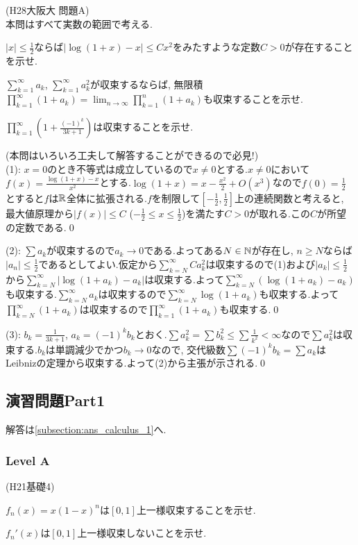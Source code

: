 \begin{egprob} (H28大阪大 問題A) \label{egprob:H28-osaka-A}\\
本問はすべて実数の範囲で考える.
\ben
\item $|x| \leq \frac{1}{2}$ならば$|\log{(1+x)} - x|\leq Cx^2$をみたすような定数$C>0$が存在することを示せ.
\item $\sum_{k=1}^{\infty}a_k$, $\sum_{k=1}^{\infty}a_k^2$が収束するならば, 無限積$\prod_{k=1}^{\infty} (1+a_k) = \lim_{n\to \infty} \prod_{k=1}^{n} (1+a_k)$も収束することを示せ.
\item $\prod_{k=1}^{\infty} \left(1+\frac{(-1)^{k}}{3k+1}\right)$は収束することを示せ.
\een
\end{egprob}
\begin{egans} (本問はいろいろ工夫して解答することができるので必見!)\\
(1): $x=0$のとき不等式は成立しているので$x\neq 0$とする.$x\neq 0$において$f(x) = \frac{\log{(1+x)} - x}{x^2}$とする.$\log{(1+x)} = x - \frac{x^2}{2} + O(x^3)$なので$f(0) = \frac{1}{2}$とすると$f$は$\mathbb{R}$全体に拡張される.$f$を制限して$[-\frac{1}{2}, \frac{1}{2}]$上の連続関数と考えると, 最大値原理から$|f(x)|\leq C$ ($-\frac{1}{2}\leq x\leq \frac{1}{2}$)を満たす$C>0$が取れる.この$C$が所望の定数である.\qed

(2): $\sum a_k$が収束するので$a_k\to 0$である.よってある$N\in \mathbb{N}$が存在し, $n\geq N$ならば$|a_n|\leq \frac{1}{2}$であるとしてよい.仮定から$\sum_{k=N}^{\infty} Ca_k^2$は収束するので(1)および$|a_k|\leq \frac{1}{2}$から$\sum_{k=N}^{\infty} |\log{(1+a_k)} - a_k|$は収束する.よって$\sum_{k=N}^{\infty}(\log{(1+a_k)} - a_k)$も収束する.$\sum_{k=N}^{\infty}a_k$は収束するので$\sum_{k=N}^{\infty} \log{(1+a_k)}$も収束する.よって$\prod_{k=N}^{\infty}(1+a_k)$は収束するので$\prod_{k=1}^{\infty}(1+a_k)$も収束する.\qed

(3): $b_k = \frac{1}{3k+1}$, $a_k = (-1)^{k}b_k$とおく.$\sum a_k^2 = \sum b_k^2 \leq \sum \frac{1}{k^2}<\infty$なので$\sum a_k^2$は収束する.$b_k$は単調減少でかつ$b_k \to 0$なので, 交代級数$\sum (-1)^{k}b_k = \sum a_k$はLeibnizの定理から収束する.よって(2)から主張が示される.\qed
\end{egans}


\clearpage
\subsection{演習問題Part1}
解答は\ref{subsection:ans_calculus_1}へ.

\subsubsection{Level A}
\begin{prob} (H21基礎4) \label{prob:H21B4}
\ben
\item  $f_n(x) = x(1-x)^{n}$は$[0,1]$上一様収束することを示せ.
\item  $f_n'(x)$は$[0,1]$上一様収束しないことを示せ.
\een
\end{prob}


